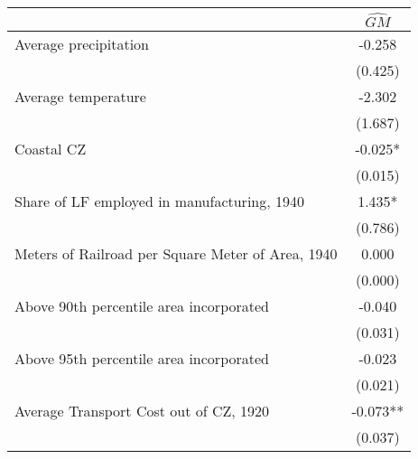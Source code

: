  \begin{tabular}{l*{1}{c}} \toprule
                &\multicolumn{1}{c}{$\widehat{GM}$}\\
\midrule
Average precipitation&   -0.258   \\
                &  (0.425)   \\
\addlinespace
Average temperature&   -2.302   \\
                &  (1.687)   \\
\addlinespace
Coastal CZ      &   -0.025*  \\
                &  (0.015)   \\
\addlinespace
Share of LF employed in manufacturing, 1940&    1.435*  \\
                &  (0.786)   \\
\addlinespace
Meters of Railroad per Square Meter of Area, 1940&    0.000   \\
                &  (0.000)   \\
\addlinespace
Above 90th percentile area incorporated&   -0.040   \\
                &  (0.031)   \\
\addlinespace
Above 95th percentile area incorporated&   -0.023   \\
                &  (0.021)   \\
\addlinespace
Average Transport Cost out of CZ, 1920&   -0.073** \\
                &  (0.037)   \\
 \bottomrule \end{tabular}
